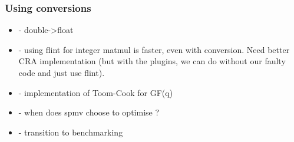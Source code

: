\subsubsection{Using conversions}
\begin{itemize}
	\item
- double->float
	\item
- using flint for integer matmul is faster, even with conversion. Need better CRA implementation (but with the plugins, we can do without our faulty code and just use flint).
	\item
- implementation of Toom-Cook for GF(q)
	\item
- when does spmv choose to optimise ?
	\item
- transition to benchmarking
\end{itemize}
